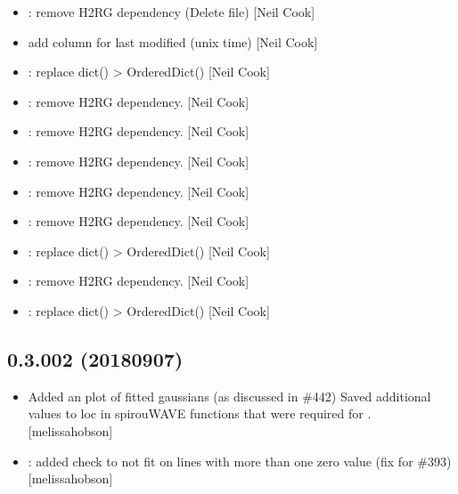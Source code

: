 \documentclass[a4paper,10pt,english]{report}
\begin{document}
\begin{itemize}
\item {} 
: remove H2RG dependency (Delete file) {[}Neil
Cook{]}

\item {} 
 \sphinxhyphen{} add column for last modified (unix time)
{[}Neil Cook{]}

\item {} 
: replace dict() \textendash{}\textgreater{} OrderedDict() {[}Neil Cook{]}

\item {} 
: remove H2RG dependency. {[}Neil Cook{]}

\item {} 
: remove H2RG dependency. {[}Neil Cook{]}

\item {} 
: remove H2RG dependency. {[}Neil Cook{]}

\item {} 
: remove H2RG dependency. {[}Neil Cook{]}

\item {} 
: remove H2RG dependency. {[}Neil Cook{]}

\item {} 
: replace dict() \textendash{}\textgreater{} OrderedDict() {[}Neil Cook{]}

\item {} 
: remove H2RG dependency. {[}Neil Cook{]}

\item {} 
: replace dict() \textendash{}\textgreater{} OrderedDict() {[}Neil Cook{]}

\end{itemize}


\subsection{0.3.002 (2018\sphinxhyphen{}09\sphinxhyphen{}07)}
\label{\detokenize{misc/changelog:id352}}\begin{itemize}
\item {} 
Added an  plot of fitted gaussians (as discussed in \#442)
Saved additional values to loc in spirouWAVE functions that were
required for . {[}melissa\sphinxhyphen{}hobson{]}

\item {} 
: added check to not fit on lines with more than one zero\sphinxhyphen{}
value (fix for \#393) {[}melissa\sphinxhyphen{}hobson{]}

\end{itemize}
\end{document}
